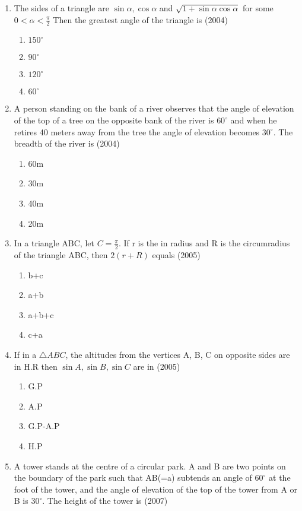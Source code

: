 \documentclass[12pt]{article}
\begin{document}
\begin{enumerate}
\begin{enumerate}
\begin{enumerate}
\end{enumerate}
\item The sides of a triangle are $\sin \alpha, \cos \alpha$ and $\sqrt{1+\sin\alpha\cos \alpha}$ for some $0<\alpha<\frac{\pi}{2}$ Then the greatest angle of the triangle is (2004)
\begin{enumerate}
\item $150^\circ$
\item $90^\circ$
\item $120^\circ$
\item $60^\circ$
\end{enumerate}
\item A person standing on the bank of a river observes that the angle of elevation of the top of a tree on the opposite bank of the river is $60^\circ$ and when he retires 40 meters away from the tree the angle of elevation becomes $30^\circ$. The breadth of the river is (2004)
\begin{enumerate}
\item 60m
\item 30m
\item 40m
\item 20m
\end{enumerate}
\item In a triangle ABC, let $C=\frac{\pi}{2}$. If r is the in radius and R is the circumradius of the triangle ABC, then $2(r+R)$ equals (2005) 
\begin{enumerate}
\item b+c
\item a+b
\item a+b+c
\item c+a
\end{enumerate}
\item If in a $\triangle ABC$, the altitudes from the vertices A, B, C on opposite sides are in H.R then $\sin A,\sin B,\sin C$ are in (2005)
\begin{enumerate}
\item G.P
\item A.P
\item G.P-A.P
\item H.P
\end{enumerate}
\item  A tower stands at the centre of a circular park. A and B are two points on the boundary of the park such that AB(=a) subtends an angle of $60^\circ$ at the foot of the tower, and the angle of elevation of the top of the tower from A or B is $30^\circ$. The height of the tower is (2007)
\begin{enumerate}

\end{enumerate}
\end{enumerate}
\end{enumerate}
\end{document}

